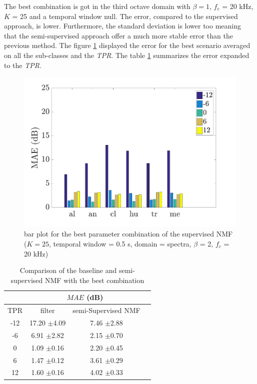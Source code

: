 \documentclass[twocolumn,a4paper,10pt]{article}
\begin{document}
The best combination is got in the third octave domain with $\beta = 1$, $f_c$ = 20 kHz, $K$ = 25 and a temporal window null. The error, compared to the supervised approach, is lower. Furthermore, the standard deviation is lower too meaning that the semi-supervised approach offer a much more stable error than the previous method. The figure \ref{fig:nmfSemiSupervisedAmbiance} displayed the error for the best scenario averaged on all the sub-classes and the \textit{TPR}. The table \ref{tab:comparisonFilterSemiSupervised} summarizes the error expanded to the \textit{TPR}.

\begin{figure}[hbtp]
\centering
\includegraphics[width=\linewidth]{../image/AmbianceNmfSemiSupervised.pdf}
\caption{bar plot for the best parameter combination of the supervised NMF ($K = 25$, temporal window = 0.5 s, domain = spectra, $\beta$ = 2, $f_c$ = 20 kHz)}
\label{fig:nmfSemiSupervisedAmbiance}
\end{figure}

\begin{table}
\centering
\begin{tabular}{cccc} 
    & \multicolumn{2}{c}{$MAE$ (dB)} \\ \hline
TPR & filter & semi-Supervised NMF \\ \hline 
 -12 & 17.20 $\pm$4.09 &  7.46 $\pm$2.88 \\ 
 -6 &  6.91 $\pm$2.82 & 2.15 $\pm$0.70\\ 
 0 & 1.09 $\pm$0.16 &  2.20 $\pm$0.45\\ 
 6 &  1.47 $\pm$0.12 &  3.61 $\pm$0.29\\ 
 12 &  1.60 $\pm$0.16 &  4.02 $\pm$0.33\\ 
\end{tabular} 
\caption{Comparison of the baseline and semi-supervised NMF with the best combination}
\label{tab:comparisonFilterSemiSupervised}
\end{table}
\end{document}

